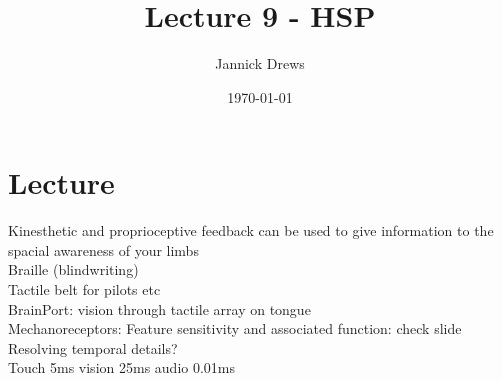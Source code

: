 \documentclass{article}
\title{Lecture 9 - HSP}
\author{Jannick Drews}
\date{\today}
\begin{document}
\maketitle
\newpage


\section{Lecture}
Kinesthetic and proprioceptive feedback can be used to give information to the spacial awareness of your limbs\\
Braille (blindwriting)\\
Tactile belt for pilots etc\\
BrainPort: vision through tactile array on tongue\\
Mechanoreceptors: Feature sensitivity and associated function: check slide\\
Resolving temporal details?\\
Touch 5ms vision 25ms audio 0.01ms\\
\end{document}
